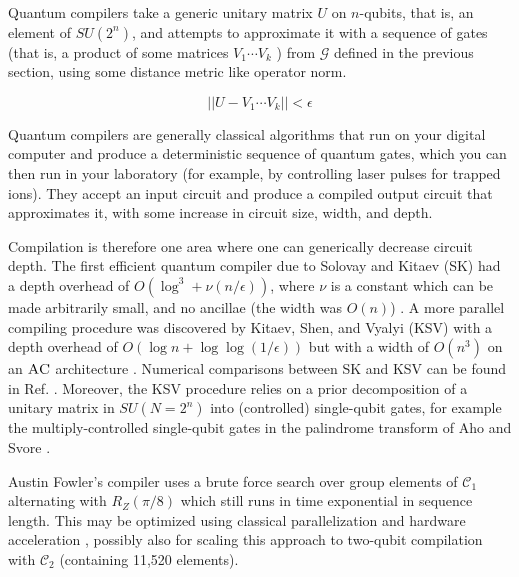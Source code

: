 Quantum compilers take a
generic unitary matrix $U$ on $n$-qubits, that is, an element of $SU(2^n)$, and
attempts to approximate it with a sequence of gates
(that is, a product of some matrices $V_1\cdots V_k$ )
from $\mathcal{G}$
defined in the previous section, using some distance metric like
operator norm.

\begin{equation}
|| U - V_1\cdots V_k || < \epsilon
\end{equation}

Quantum compilers are generally classical algorithms that run on your
digital computer and produce a deterministic sequence of quantum gates, which
you can then run in your laboratory (for example, by controlling laser pulses
for trapped ions). They accept an input circuit and produce a compiled
output circuit that approximates it, with some increase in circuit size,
width, and depth.

Compilation is therefore
one area where one can generically decrease circuit depth.
The first efficient quantum compiler due to
Solovay and Kitaev (SK) had a depth overhead of $O(\log^3+\nu(n/\epsilon))$,
where $\nu$ is a constant which can be made arbitrarily small, and no
ancillae (the width was $O(n)$) \cite{Dawson2005}.
A more parallel compiling procedure was discovered by Kitaev, Shen, and
Vyalyi (KSV) with a depth overhead of $O(\log n + \log\log(1/\epsilon))$ but
with a width of $O(n^3)$ on an $\textsc{AC}$ architecture \cite{Kitaev2002}.
Numerical comparisons between SK and KSV can be found in Ref. \cite{Pham2012a}.
Moreover, the KSV procedure relies on a prior decomposition of
a unitary matrix in $SU(N=2^n)$ into (controlled) single-qubit gates,
for example the multiply-controlled single-qubit gates in
the palindrome transform of Aho and Svore \cite{Aho2003}.

Austin Fowler's compiler uses a brute force search over group elements of
$\mathcal{C}_1$ alternating with $R_Z(\pi/8)$ which still runs in time
exponential in sequence length.
This may be optimized using classical parallelization and hardware acceleration
\cite{Booth2012}, possibly also for scaling this approach to
two-qubit compilation with $\mathcal{C}_2$ (containing 11,520
elements).
